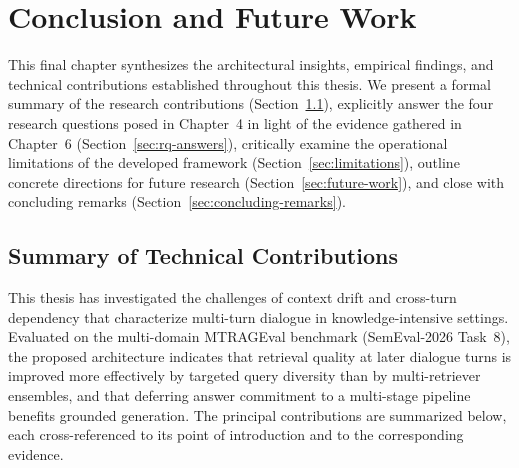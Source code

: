 \chapter{Conclusion and Future Work}
\label{chapter:conclusion}

This final chapter synthesizes the architectural insights, empirical findings, and technical contributions established throughout this thesis. We present a formal summary of the research contributions (Section~\ref{sec:contributions}), explicitly answer the four research questions posed in Chapter~4 in light of the evidence gathered in Chapter~6 (Section~\ref{sec:rq-answers}), critically examine the operational limitations of the developed framework (Section~\ref{sec:limitations}), outline concrete directions for future research (Section~\ref{sec:future-work}), and close with concluding remarks (Section~\ref{sec:concluding-remarks}).

\section{Summary of Technical Contributions}
\label{sec:contributions}

This thesis has investigated the challenges of context drift and cross-turn dependency that characterize multi-turn dialogue in knowledge-intensive settings. Evaluated on the multi-domain MTRAGEval benchmark (SemEval-2026 Task~8), the proposed architecture indicates that retrieval quality at later dialogue turns is improved more effectively by targeted query diversity than by multi-retriever ensembles, and that deferring answer commitment to a multi-stage pipeline benefits grounded generation. The principal contributions are summarized below, each cross-referenced to its point of introduction and to the corresponding evidence.

